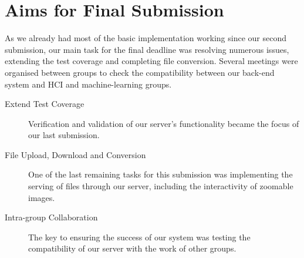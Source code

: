 \section{Aims for Final Submission}
As we already had most of the basic implementation working since our second submission, our main task for the final deadline was resolving numerous issues, extending the test coverage and completing file conversion. Several meetings were organised between groups to check the compatibility between our back-end system and HCI and machine-learning groups.
\begin{description}
  \item[Extend Test Coverage] Verification and validation of our server's functionality became the focus of our last submission.
  \item[File Upload, Download and Conversion] One of the last remaining tasks for this submission was implementing the serving of files through our server, including the interactivity of zoomable images.
  \item[Intra-group Collaboration] The key to ensuring the success of our system was testing the compatibility of our server with the work of other groups.
\end{description}
